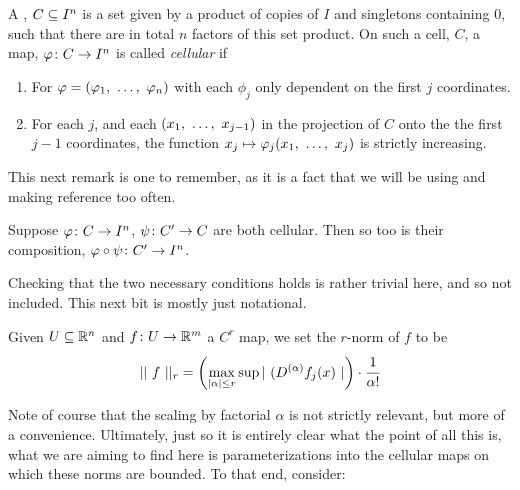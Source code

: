 \begin{definition}
  A \emph{\bc}, $\CIn[C]{n}$ is a set given by a product of copies of $I$ and singletons containing $0$, such that there are in total $n$ factors of this set product. On such a cell, $C$, a \cont map, $\funcdom{\phi}{C}{I^n}$ is called \emph{cellular} if
    \begin{enumerate}
      \item For $\phi = (\vonevm{\phi}{n})$ with each $\phi_j$ only dependent on the first $j$ coordinates.

      \item For each $j$, and each $(\vonevm{x}{j - 1})$ in the projection of $C$ onto the the first $j - 1$ coordinates, the function $x_j \mapsto \phi_j(\vonevm{x}{j})$ is strictly increasing.
    \end{enumerate}

\end{definition}

This next remark is one to remember, as it is a fact that we will be using and making reference too often.


\begin{remark}
  Suppose $\funcdom{\phi}{C}{I^n}$, $\funcdom{\psi}{\pri{C}}{C}$ are both cellular. Then so too is their composition, $\funcdom{\phi \circ \psi}{\pri{C}}{I^n}$.
\end{remark}
Checking that the two necessary conditions holds is rather trivial here, and so not included. This next bit is mostly just notational.

\begin{definition}
  Given $\XRn[U]{n}$ and $\funcdom{f}{U}{\R^m}$ a $C^r$ map, we set the $r$-norm of $f$ to be
    \begin{align*}
      \rnorm[r]{\ f \ } = \left( \max_{\abs{\alpha} \leq r}{ \sup{ \abs{ \ ( D^{(\alpha)} f_j(x) \ } } } \right) \cdot \cfrac{1}{\alpha !}
    \end{align*}
\end{definition}

Note of course that the scaling by factorial $\alpha$ is not strictly relevant, but more of a convenience. Ultimately, just so it is entirely clear what the point of all this is, what we are aiming to find here is parameterizations into the cellular maps on which these norms are bounded. To that end, consider:

